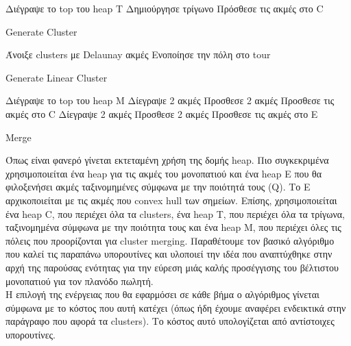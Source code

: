 \documentclass[oneside,12pt]{book}
\theoremstyle{definition}
\begin{document}
\begin{algorithm}[H]
	\SetAlgoLined
	
	Διέγραψε το top του heap T \;
	Δημιούργησε τρίγωνο \;
	Πρόσθεσε τις ακμές στο C \;
	
	\caption{Generate Cluster}
\end{algorithm}

\begin{algorithm}[H]
	\SetAlgoLined
	
	{Άνοιξε clusters με Delaunay ακμές \;
	Ενοποίησε την πόλη στο tour \;}
	
	\caption{Generate Linear Cluster}
\end{algorithm}

\newpage

\begin{algorithm}[H]
	\SetAlgoLined
	
	Διέγραψε το top του heap Μ \;
	{Δίεγραψε 2 ακμές \;
	Προσθεσε 2 ακμές \;
	Προσθεσε τις ακμές στο C \;}
	\Else
	{Δίεγραψε 2 ακμές \;
	Προσθεσε 2 ακμές \;
	Προσθεσε τις ακμές στο Ε \;}
	
	\caption{Merge}
\end{algorithm}

Όπως είναι φανερό γίνεται εκτεταμένη χρήση της δομής heap. Πιο συγκεκριμένα χρησιμοποιείται ένα heap για τις ακμές του μονοπατιού και ένα heap Ε που θα φιλοξενήσει ακμές ταξινομημένες σύμφωνα με την ποιότητά τους (Q). Το Ε αρχικοποιείται με τις ακμές που convex hull των σημείων. Επίσης, χρησιμοποιείται ένα heap C, που περιέχει όλα τα clusters, ένα heap T, που περιέχει όλα τα τρίγωνα, ταξινομημένα σύμφωνα με την ποιότητα τους και ένα heap M, που περιέχει όλες τις πόλεις που προορίζονται για cluster merging. Παραθέτουμε τον βασικό αλγόριθμο που καλεί τις παραπάνω υπορουτίνες και υλοποιεί την ιδέα που αναπτύχθηκε στην αρχή της παρούσας ενότητας για την εύρεση μιάς καλής προσέγγισης του βέλτιστου μονοπατιού για τον πλανόδο πωλητή. \\

Η επιλογή της ενέργειας που θα εφαρμόσει σε κάθε βήμα ο αλγόριθμος γίνεται σύμφωνα με το κόστος που αυτή κατέχει (όπως ήδη έχουμε αναφέρει ενδεικτικά στην παράγραφο που αφορά τα clusters). Το κόστος αυτό υπολογίζεται από αντίστοιχες υπορουτίνες. \\
\end{document}
